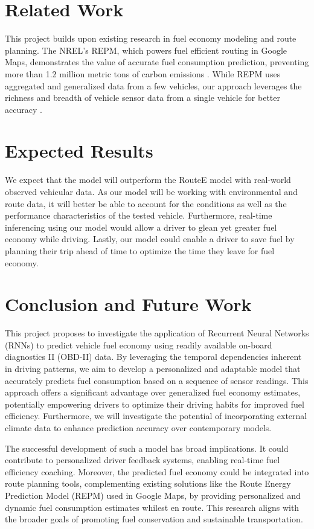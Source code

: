 \documentclass[letterpaper]{article}
\begin{document}
\section{Related Work}

This project builds upon existing research in fuel economy modeling and route planning. 
The NREL's REPM, which powers fuel efficient routing in Google Maps, 
demonstrates the value of accurate fuel consumption prediction, 
preventing more than 1.2 million metric tons of carbon emissions \cite{google_2023_environmental_report}.
While REPM uses aggregated and generalized data from a few vehicles, 
our approach leverages the richness and breadth of vehicle sensor data from a single vehicle for better accuracy \cite{nrel_routee}.



\section{Expected Results}

We expect that the model will outperform the RouteE model with real-world observed vehicular data. 
As our model will be working with environmental and route data, 
it will better be able to account for the conditions as well as the performance characteristics of the tested vehicle.
Furthermore, real-time inferencing using our model would allow a driver to glean yet greater fuel economy while driving.
Lastly, our model could enable a driver to save fuel by planning their trip ahead of time to optimize the time they leave for fuel economy.

\section{Conclusion and Future Work}

This project proposes to investigate the application of Recurrent Neural Networks (RNNs) to predict vehicle fuel economy using readily available on-board diagnostics II (OBD-II) data. 
By leveraging the temporal dependencies inherent in driving patterns, 
we aim to develop a personalized and adaptable model that accurately predicts fuel consumption based on a sequence of sensor readings. 
This approach offers a significant advantage over generalized fuel economy estimates, 
potentially empowering drivers to optimize their driving habits for improved fuel efficiency. 
Furthermore, we will investigate the potential of incorporating external climate data to enhance prediction accuracy over contemporary models.

The successful development of such a model has broad implications. 
It could contribute to personalized driver feedback systems, 
enabling real-time fuel efficiency coaching. 
Moreover, the predicted fuel economy could be integrated into route planning tools, 
complementing existing solutions like the Route Energy Prediction Model (REPM) used in Google Maps, 
by providing personalized and dynamic fuel consumption estimates whilest en route. 
This research aligns with the broader goals of promoting fuel conservation and sustainable transportation.

 

\end{document}
